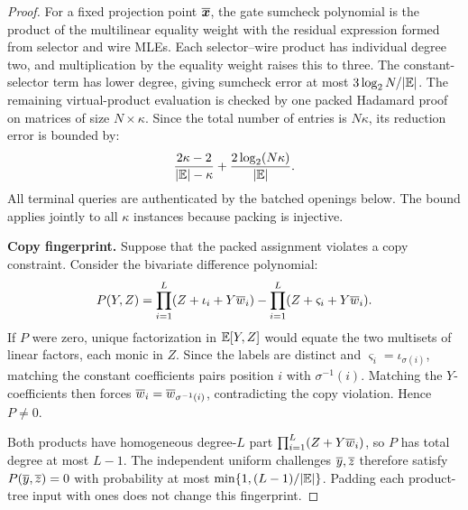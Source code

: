 \begin{proof}
For a fixed projection point \(\overline{\bm x}\), the gate
sumcheck polynomial is the product of the multilinear equality
weight with the residual expression formed from selector and wire
MLEs. Each selector--wire product has individual degree two,
and multiplication by the equality weight raises this to three.
The constant-selector term has lower degree, giving sumcheck
error at most \(3\log_2N/|\mathbb{E}|\).
The remaining virtual-product evaluation is checked by one
packed Hadamard proof on matrices of size \(N\times\kappa\).
Since the total number of entries is \(N\kappa\), its
reduction error is bounded by:
\[
    \frac{2\kappa-2}{|\mathbb{E}|-\kappa}
       +\frac{2\log_2(N\kappa)}{|\mathbb{E}|}.
\]
All terminal queries are authenticated by the batched openings below.
The bound applies jointly to all \(\kappa\) instances because
packing is injective.

\smallskip\noindent\textbf{Copy fingerprint.}
Suppose that the packed assignment violates a copy constraint.
Consider the bivariate difference polynomial:
\[
    P(Y,Z)=
       \prod_{i=1}^{L}(Z+\iota_i+Y\overline{w}_i)
       -\prod_{i=1}^{L}(Z+\varsigma_i+Y\overline{w}_i).
\]
If \(P\) were zero, unique factorization in
\(\mathbb{E}[Y,Z]\) would equate the two multisets of
linear factors, each monic in \(Z\).
Since the labels are distinct and
\(\varsigma_i=\iota_{\sigma(i)}\), matching the constant
coefficients pairs position \(i\) with \(\sigma^{-1}(i)\).
Matching the \(Y\)-coefficients then forces
\(\overline{w}_i=\overline{w}_{\sigma^{-1}(i)}\), contradicting the copy
violation. Hence \(P\ne0\).

Both products have homogeneous degree-\(L\) part
\(\prod_{i=1}^{L}(Z+Y\overline{w}_i)\), so \(P\) has total degree
at most \(L-1\).
The independent uniform challenges \(\overline{y},\overline{z}\)
therefore satisfy \(P(\overline{y},\overline{z})=0\) with probability at
most \(\min\{1,(L-1)/|\mathbb{E}|\}\).
Padding each product-tree input with ones does not change
this fingerprint.


\end{proof}
